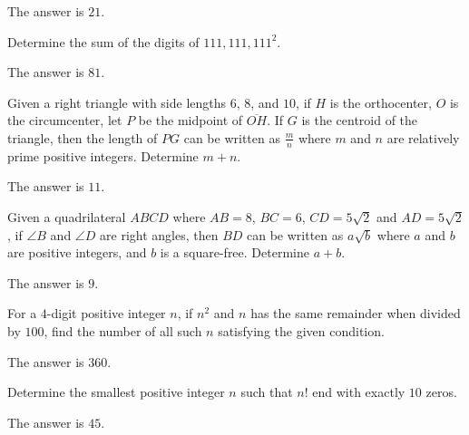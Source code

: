 \begin{solution}
The answer is $21$.
\end{solution}

\begin{problem}
Determine the sum of the digits of $111,111,111^2$.
\end{problem}

\begin{solution}
The answer is $81$.
\end{solution}

\begin{problem}
Given a right triangle with side lengths $6$, $8$, and $10$, if $H$ is the orthocenter, $O$ is the circumcenter, let $P$ be the midpoint of $\overline{OH}$. If $G$ is the centroid of the triangle, then the length of $PG$ can be written as $\frac{m}{n}$ where $m$ and $n$ are relatively prime positive integers. Determine $m+n$.
\end{problem}

\begin{solution}
The answer is $11$.
\end{solution}

\begin{problem}
Given a quadrilateral $ABCD$ where $AB=8$, $BC=6$, $CD=5\sqrt{2}$ and $AD=5\sqrt{2}$, if $\angle B$ and $\angle D$ are right angles, then $BD$ can be written as $a\sqrt{b}$ where $a$ and $b$ are positive integers, and $b$ is a square-free. Determine $a+b$.
\end{problem}

\begin{solution}
The answer is $9$.
\end{solution}

\begin{problem}
For a $4$-digit positive integer $n$, if $n^2$ and $n$ has the same remainder when divided by $100$, find the number of all such $n$ satisfying the given condition.
\end{problem}

\begin{solution}
The answer is $360$.
\end{solution}

\begin{problem}
Determine the smallest positive integer $n$ such that $n!$ end with exactly $10$ zeros.
\end{problem}

\begin{solution}
The answer is $45$.
\end{solution}


